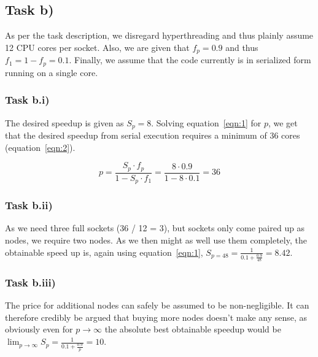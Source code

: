 \documentclass[11pt,a4paper]{article}
\begin{document}
\subsection{Task b)}
As per the task description, we disregard hyperthreading and thus plainly assume 12 CPU cores per socket. Also, we are given that 
$f_p = 0.9$ and thus $f_1 = 1 - f_p = 0.1$. Finally, we assume that the code currently is in serialized form running on a single core.

\subsubsection{Task b.i)}
The desired speedup is given as $S_p = 8$. Solving equation~\ref{eqn:1} for $p$, 
we get that the desired speedup from serial execution requires a minimum of 36 cores (equation~\ref{eqn:2}).

\begin{equation}
    p = \frac{S_p \cdot f_p}{1 - S_p \cdot f_1 } = \frac{8 \cdot 0.9}{1 - 8 \cdot 0.1} = 36
\label{eqn:2}
\end{equation}

\subsubsection{Task b.ii)}
As we need three full sockets (36 / 12 = 3), but sockets only come paired up as nodes, we require two nodes. As we then might as well
use them completely, the obtainable speed up is, again using equation~\ref{eqn:1}, $S_{p=48} = \frac{1}{0.1 + \frac{0.9}{48}} = 8.42$.

\subsubsection{Task b.iii)}
The price for additional nodes can safely be assumed to be non-negligible. It can therefore credibly be argued that buying more nodes doesn't 
make any sense, as obviously even for $p \rightarrow \infty$ the absolute best obtainable speedup would be
 $\lim_{p \rightarrow \infty} S_p = \frac{1}{0.1 + \frac{0.9}{p}} = 10$.

\end{document}
